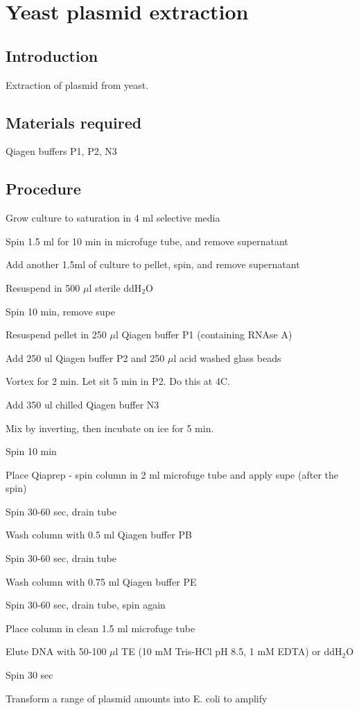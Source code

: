 \chapter{Yeast plasmid extraction}

\newpage
\setlength{\parindent}{0pt}
\setcounter{secnumdepth}{5}
\setcounter{section}{0}
\renewcommand*{\theHsection}{pcr.\the\value{section}}

\section{Introduction}
Extraction of plasmid from yeast.
\section{Materials required}
	\begin{packed_enum}
	\item Qiagen buffers P1, P2, N3
	\end{packed_enum}

\section{Procedure}
	\begin{packed_enum}
	\item Grow culture to saturation in 4 ml selective media
	\item Spin 1.5 ml for 10 min in microfuge tube, and remove supernatant
	\item Add another 1.5ml of culture to pellet, spin, and remove supernatant
	\item Resuspend in 500 $\mu$l sterile ddH$_ 2 $O
	\item Spin 10 min, remove supe
	\item Resuspend pellet in 250 $\mu$l Qiagen buffer P1 (containing RNAse A)
	\item Add 250 ul Qiagen buffer P2 and 250 $\mu$l acid washed glass beads
	\item Vortex for 2 min. Let sit 5 min in P2. Do this at 4C.
	\item Add 350 ul chilled Qiagen buffer N3
	\item Mix by inverting, then incubate on ice for 5 min.
	\item Spin 10 min
	\item Place Qiaprep - spin column in 2 ml microfuge tube and apply supe (after the spin)
	\item Spin 30-60 sec, drain tube
	\item Wash column with 0.5 ml Qiagen buffer PB
	\item Spin 30-60 sec, drain tube
	\item Wash column with 0.75 ml Qiagen buffer PE
	\item Spin 30-60 sec, drain tube, spin again
	\item Place column in clean 1.5 ml microfuge tube
	\item Elute DNA with 50-100 $\mu$l TE (10 mM Tris-HCl pH 8.5, 1 mM EDTA) or ddH$_ 2 $O
	\item Spin 30 sec
	\item Transform a range of plasmid amounts into E. coli to amplify
	\end{packed_enum}
